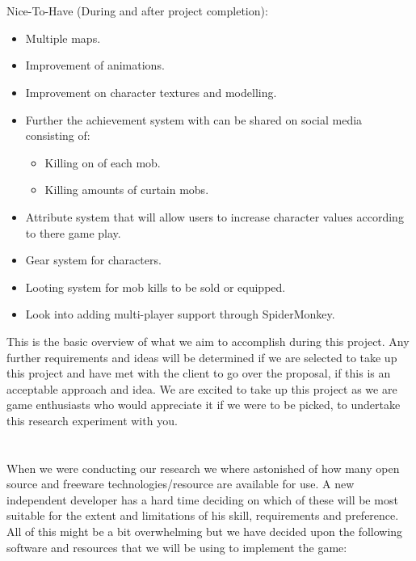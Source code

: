 \documentclass[letterpaper]{article}
\begin{document}
			\\
			\\
			Nice-To-Have (During and after project completion): \\
			\begin{itemize}
				\item Multiple maps.
				\item Improvement of animations.
				\item Improvement on character textures and modelling.
				\item Further the achievement system with can be shared on social media consisting of:
					\begin{itemize}
						\item Killing on of each mob.
						\item Killing amounts of curtain mobs.
					\end{itemize}
				\item Attribute system that will allow users to increase character values according to there game play.
				\item Gear system for characters.
				\item Looting system for mob kills to be sold or equipped.
				\item Look into adding multi-player support through SpiderMonkey.
			\end{itemize}
			
			\vspace{0.1in}
			\noindent This is the basic overview of what we aim to accomplish during this project. Any further requirements and ideas will be determined if we are selected to take up this project and have met with the client to go over the proposal, if this is an acceptable approach and idea. We are excited to take up this project as we are game enthusiasts who would appreciate it if we were to be picked, to undertake this research experiment with you.
		
		\vspace{0.2in}
		
		\section*{\colorbox{blue}{}} 
		
		\vspace{0.2in}
		
		When we were conducting our research we where astonished of how many open source and freeware technologies/resource are available for use. A new independent developer has a hard time deciding on which of these will be most suitable for the extent and limitations of his skill, requirements and preference. All of this might be a bit overwhelming but we have decided upon the following software and resources that we will be using to implement the game:
		
\end{document}
